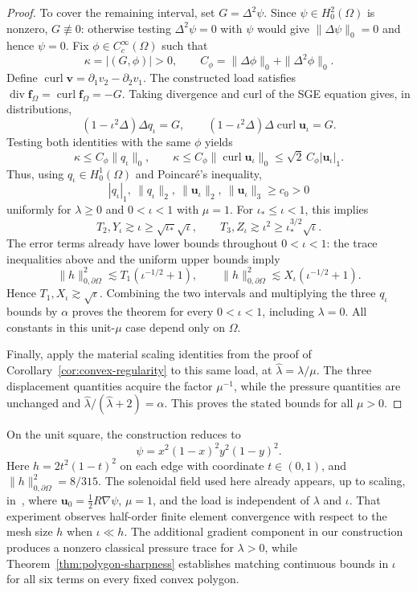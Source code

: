 \documentclass[10pt]{amsart}
\renewcommand{\div}{\operatorname{div}}
\numberwithin{equation}{section}
\begin{document}
\begin{proof}
To cover the remaining interval, set $G=\Delta^2\psi$. Since $\psi\in H_0^2(\Omega)$ is nonzero, $G\not\equiv0$: otherwise testing $\Delta^2\psi=0$ with $\psi$ would give $\|\Delta\psi\|_0=0$ and hence $\psi=0$. Fix $\phi\in C_c^\infty(\Omega)$ such that
\[
\kappa=|(G,\phi)|>0,\qquad
C_\phi=\|\Delta\phi\|_0+\|\Delta^2\phi\|_0.
\]
Define $\operatorname{curl}\boldsymbol v=\partial_1v_2-\partial_2v_1$. The constructed load satisfies
$\div\boldsymbol f_\Omega=\operatorname{curl}\boldsymbol f_\Omega=-G$.
Taking divergence and curl of the SGE equation gives, in distributions,
\[
(1-\iota^2\Delta)\Delta q_\iota=G,\qquad
(1-\iota^2\Delta)\Delta\operatorname{curl}\boldsymbol u_\iota=G.
\]
Testing both identities with the same $\phi$ yields
\[
\kappa\leq C_\phi\|q_\iota\|_0,\qquad
\kappa\leq C_\phi\|\operatorname{curl}\boldsymbol u_\iota\|_0
\leq\sqrt2\,C_\phi|\boldsymbol u_\iota|_1.
\]
Thus, using $q_\iota\in H_0^1(\Omega)$ and Poincar\'e's inequality,
\[
|q_\iota|_1,\ \|q_\iota\|_2,\
\|\boldsymbol u_\iota\|_2,\ \|\boldsymbol u_\iota\|_3\geq c_0>0
\]
uniformly for $\lambda\geq0$ and $0<\iota<1$ with $\mu=1$. For $\iota_\ast\leq\iota<1$, this implies
\[
T_2,Y_\iota\gtrsim\iota\geq\sqrt{\iota_\ast}\sqrt\iota,\qquad
T_3,Z_\iota\gtrsim\iota^2\geq\iota_\ast^{3/2}\sqrt\iota.
\]
The error terms already have lower bounds throughout $0<\iota<1$: the trace inequalities above and the uniform upper bounds imply
\[
\|h\|_{0,\partial\Omega}^2
\lesssim T_1(\iota^{-1/2}+1),\qquad
\|h\|_{0,\partial\Omega}^2
\lesssim X_\iota(\iota^{-1/2}+1).
\]
Hence $T_1,X_\iota\gtrsim\sqrt\iota$. Combining the two intervals and multiplying the three $q_\iota$ bounds by $\alpha$ proves the theorem for every $0<\iota<1$, including $\lambda=0$. All constants in this unit-$\mu$ case depend only on $\Omega$.

Finally, apply the material scaling identities from the proof of Corollary~\ref{cor:convex-regularity} to this same load, at $\widehat\lambda=\lambda/\mu$. The three displacement quantities acquire the factor $\mu^{-1}$, while the pressure quantities are unchanged and
$\widehat\lambda/(\widehat\lambda+2)=\alpha$.
This proves the stated bounds for all $\mu>0$.
\end{proof}

On the unit square, the construction reduces to
\[
\psi=x^2(1-x)^2y^2(1-y)^2.
\]
Here $h=2t^2(1-t)^2$ on each edge with coordinate $t\in(0,1)$, and
$\|h\|_{0,\partial\Omega}^2=8/315$.
The solenoidal field used here already appears, up to scaling, in~\cite[Example~6.2, p.~2257]{ChenHuangHuang2023}, where $\boldsymbol u_0=\tfrac12R\nabla\psi$, $\mu=1$, and the load is independent of $\lambda$ and $\iota$. That experiment observes half-order finite element convergence with respect to the mesh size $h$ when $\iota\ll h$. The additional gradient component in our construction produces a nonzero classical pressure trace for $\lambda>0$, while Theorem~\ref{thm:polygon-sharpness} establishes matching continuous bounds in $\iota$ for all six terms on every fixed convex polygon.
\end{document}
